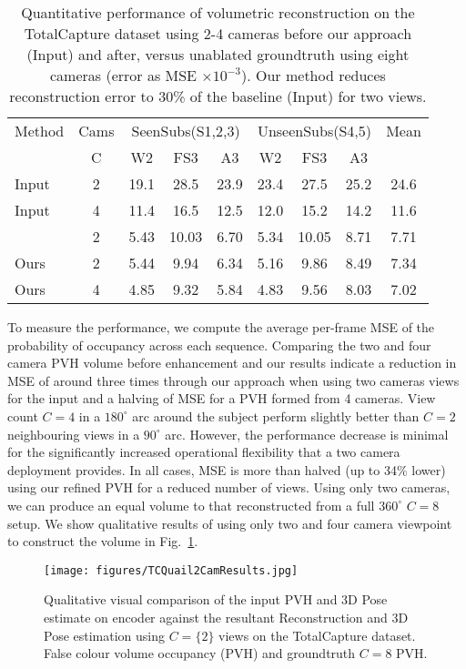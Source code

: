 \documentclass{bmvc2k}
\newcommand{\squeezeup}{\vspace{-2mm}}
\begin{document}
\begin{table}[htb]
\centering
{
\small
\begin{tabular}{lcccccccc}
\hline
Method&Cams &\multicolumn{3}{c}{SeenSubs(S1,2,3)}&\multicolumn{3}{c}{UnseenSubs(S4,5)} & Mean   \\
                             & C&W2  &FS3  & A3  &W2  &FS3  &A3  &       \\ \hline
Input                    &2 &19.1&28.5 &23.9 &23.4&27.5 &25.2&24.6   \\
Input                     & 4&11.4&16.5 &12.5 &12.0& 15.2&14.2&11.6  \\ \hline
~\cite{gilbert2018volumetric}& 2&5.43&10.03&6.70 &5.34&10.05&8.71&7.71 \\ \hline
Ours                     &2 &5.44& 9.94&6.34 &5.16&9.86 &8.49&7.34  \\   
Ours                     &4 &4.85& 9.32&5.84 &4.83&9.56 &8.03&7.02  \\   \hline
\end{tabular}
}
\caption{ Quantitative performance of volumetric reconstruction on the TotalCapture dataset using 2-4 cameras before our approach (Input) and after, versus unablated groundtruth using eight cameras (error as MSE $\times 
10^{-3}$).  Our method reduces reconstruction error to 30\% of the baseline (Input) for two views.}
\label{tab:QuantTC}
\end{table}
To measure the performance, we compute the average per-frame MSE of the probability of occupancy across each sequence. Comparing the two and four camera PVH volume before enhancement and our results indicate a reduction in MSE of around three times through our approach when using two cameras views for the input and a halving of MSE for a PVH formed from 4 cameras. View count $C=4$ in a $180^\circ$ arc around the subject perform slightly better than $C=2$ neighbouring views in a $90^\circ$ arc. However, the performance decrease is minimal for the significantly increased operational flexibility that a two camera deployment provides. In all cases, MSE is more than halved (up to 34\% lower) using our refined PVH for a reduced number of views.  Using only two cameras, we can produce an equal volume to that reconstructed from a full $360^\circ$ $C=8$ setup. We show qualitative results of using only two and four camera viewpoint to construct the volume in Fig.~\ref{fig:TCQuail2CamResults}.

\begin{figure}[htb]
\centering
\texttt{[image: figures/TCQuail2CamResults.jpg]}
\caption{Qualitative visual comparison of the input PVH and 3D Pose estimate on encoder against the resultant Reconstruction and 3D Pose estimation using $C=\{2\}$ views on the TotalCapture dataset. False colour volume occupancy (PVH) and groundtruth $C=8$ PVH.}
\label{fig:TCQuail2CamResults}
\end{figure}
\squeezeup
\squeezeup
\end{document}
